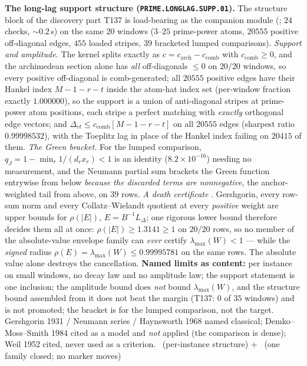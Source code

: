 \documentclass[11pt,a4paper]{article}
\theoremstyle{definition}
\begin{document}
\par\smallskip\noindent\textbf{The long-lag support structure
(\texttt{PRIME.LONGLAG.SUPP.01}).}
The structure block of the discovery part T137 is load-bearing as the companion
module (; $24$ checks, ${\sim}0.2$\,s) on the
same $20$ windows ($3$--$25$ prime-power atoms, $20555$ positive off-diagonal
edges, $455$ loaded stripes, $39$ bracketed lumped comparisons).
\emph{Support and amplitude.} The kernel splits exactly as
$c=c_{\mathrm{arch}}-c_{\mathrm{comb}}$ with $c_{\mathrm{comb}}\ge0$, and the
archimedean section alone has \emph{all} off-diagonals $\le0$ on $20/20$ windows,
so every positive off-diagonal is comb-generated; all $20555$ positive edges have
their Hankel index $M-1-r-t$ inside the atom-hat index set (per-window fraction
exactly $1.000000$), so the support is a union of anti-diagonal stripes at
prime-power atom positions, each stripe a perfect matching with \emph{exactly}
orthogonal edge vectors; and
$\Delta_{rt}\le c_{\mathrm{comb}}[M-1-r-t]$ on all $20555$ edges (sharpest ratio
$0.99998532$), with the Toeplitz lag in place of the Hankel index failing on
$20415$ of them.
\emph{The Green bracket.} For the lumped comparison, $q_J=1-\min_r1/(d_rx_r)<1$
is an identity ($8.2\times10^{-16}$) needing no measurement, and the Neumann
partial sum brackets the Green function entrywise from below
\emph{because the discarded terms are nonnegative}, the anchor-weighted tail from
above, on $39$ rows.
\emph{A death certificate} \mX. Gershgorin, every row-sum norm and every
Collatz--Wielandt quotient at every \emph{positive} weight are upper bounds for
$\rho(|E|)$, $E=B^{-1}L_\Delta$; one rigorous lower bound therefore decides them
all at once: $\rho(|E|)\ge1.3141\ge1$ on $20/20$ rows, so no member of the
absolute-value envelope family can \emph{ever} certify $\lambda_{\max}(W)<1$ ---
while the \emph{signed} radius $\rho(E)=\lambda_{\max}(W)\le0.99995781$ on the
same rows. The absolute value alone destroys the cancellation.
\textbf{Named limits as content:} per instance on small windows, no decay law and
no amplitude law; the support statement is one inclusion; the amplitude bound
does \emph{not} bound $\lambda_{\max}(W)$, and the structure bound assembled from
it does not beat the margin (T137: $0$ of $35$ windows) and is not promoted; the
bracket is for the lumped comparison, not the target.
Gershgorin 1931 / Neumann series / Haynsworth 1968 named classical;
Demko--Moss--Smith 1984 cited as a model and \emph{not} applied (the comparison is
dense); Weil 1952 cited, never used as a criterion.
\mE\ (per-instance structure) $+$ \mX\ (one family closed; no marker moves)
\end{document}
